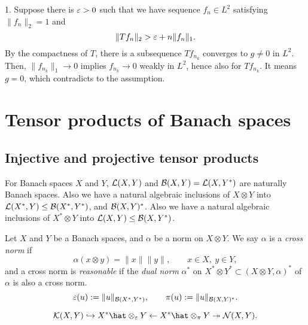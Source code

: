\documentclass{../../large}
\begin{document}
\begin{pf}
1. Suppose there is $\varepsilon>0$ such that we have sequence $f_n\in L^2$ satisfying $\|f_n\|_2=1$ and
\[\|Tf_n\|_2>\varepsilon+n\|f_n\|_1.\]
By the compactness of $T$, there is a subsequence $Tf_{n_k}$ converges to $g\ne0$ in $L^2$.
Then, $\|f_{n_k}\|_1\to0$ implies $f_{n_k}\to0$ weakly in $L^2$, hence also for $Tf_{n_k}$.
It means $g=0$, which contradicts to the assumption.
\end{pf}




\chapter{Tensor products of Banach spaces}

\section{Injective and projective tensor products}

\begin{prb}[Realizations]
For Banach spaces $X$ and $Y$, $\mathcal{L}(X,Y)$ and $\mathcal{B}(X,Y)=\mathcal{L}(X,Y^*)$ are naturally Banach spaces.
Also we have a natural algebraic inclusions of $X\otimes Y$ into $\mathcal{L}(X^*,Y)\le\mathcal{B}(X^*,Y^*)$, and $\mathcal{B}(X,Y)^*$.
Also we have a natural algebraic inclusions of $X^*\otimes Y$ into $\mathcal{L}(X,Y)\le\mathcal{B}(X,Y^*)$.
\end{prb}

\begin{prb}
Let $X$ and $Y$ be a Banach spaces, and $\alpha$ be a norm on $X\otimes Y$.
We say $\alpha$ is a \emph{cross norm} if
\[\alpha(x\otimes y)=\|x\|\|y\|,\qquad x\in X,\ y\in Y,\]
and a cross norm is \emph{reasonable} if the \emph{dual norm} $\alpha^*$ on $X^*\otimes Y^*\subset(X\otimes Y,\alpha)^*$ of $\alpha$ is also a cross norm.
\[\varepsilon(u):=\|u\|_{\mathcal{B}(X^*,Y^*)},\qquad\pi(u):=\|u\|_{\mathcal{B}(X,Y)^*}.\]
\end{prb}

\begin{prb}
\end{prb}

\begin{prb}
\[\cK(X,Y)\hookrightarrow X^*\hat\otimes_\e Y\leftarrow X^*\hat\otimes_\pi Y\twoheadrightarrow\cN(X,Y).\]
	
\end{prb}
\end{document}
